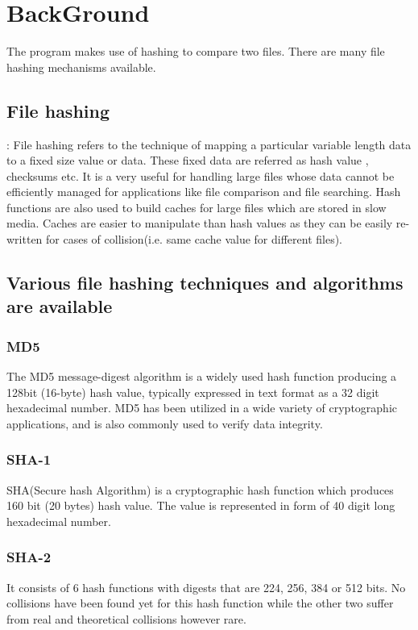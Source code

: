 \chapter{BackGround}


The program makes use of hashing to compare two files. There are many file hashing mechanisms available.
\section{File hashing}: 
File hashing refers to the technique of mapping a particular variable length data to a fixed size value or data. These fixed data are referred as hash value , checksums etc. It is a very useful for handling large files whose data cannot be efficiently managed  for applications like file comparison and file searching.
Hash functions are also used to build caches for large files which are stored in slow media. Caches are easier to manipulate than hash values as they can be easily re-written for cases of collision(i.e. same cache value for different files). 
\section{Various file hashing techniques and algorithms are available}
\subsection{MD5}The MD5 message-digest algorithm is a widely used hash function producing a 128bit (16-byte) hash value, typically expressed in text format as a 32 digit hexadecimal number. MD5 has been utilized in a wide variety of cryptographic applications, and is also commonly used to verify data integrity.

\subsection{SHA-1}   SHA(Secure hash Algorithm) is a cryptographic hash function which produces 160 bit (20 bytes) hash value. The value is represented in form of 40 digit long hexadecimal number.

\subsection{SHA-2}   It consists of 6 hash functions with digests that are 224, 256, 384 or 512 bits. No collisions have been found yet for this hash function while the other two suffer from real and theoretical collisions however rare.


